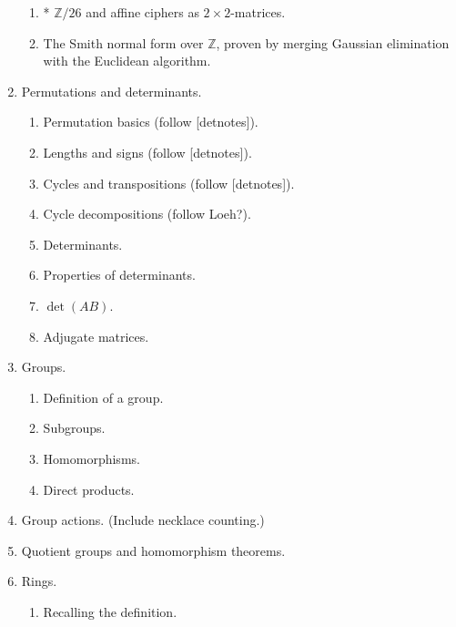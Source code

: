 \documentclass[numbers=enddot,12pt,final,onecolumn,notitlepage]{scrartcl}%
\theoremstyle{definition}
\begin{document}
\begin{enumerate}
\begin{enumerate}
\item * $\mathbb{Z}/26$ and affine ciphers as $2\times2$-matrices.

\item The Smith normal form over $\mathbb{Z}$, proven by merging Gaussian
elimination with the Euclidean algorithm.
\end{enumerate}

\item Permutations and determinants.

\begin{enumerate}
\item Permutation basics (follow [detnotes]).

\item Lengths and signs (follow [detnotes]).

\item Cycles and transpositions (follow [detnotes]).

\item Cycle decompositions (follow Loeh?).

\item Determinants.

\item Properties of determinants.

\item $\det\left(  AB\right)  $.

\item Adjugate matrices.
\end{enumerate}

\item Groups.

\begin{enumerate}
\item Definition of a group.

\item Subgroups.

\item Homomorphisms.

\item Direct products.
\end{enumerate}

\item Group actions. (Include necklace counting.)

\item Quotient groups and homomorphism theorems.

\item Rings.

\begin{enumerate}
\item Recalling the definition.


\end{enumerate}
\end{enumerate}
\end{document}

